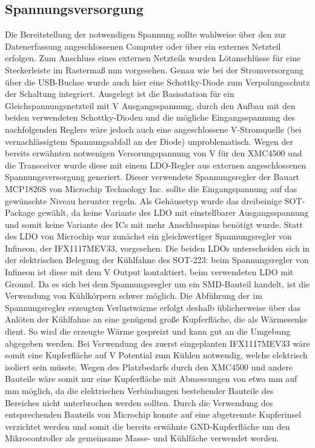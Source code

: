 \subsection{Spannungsversorgung}
Die Bereitstellung der notwendigen Spannung sollte wahlweise über den zur Datenerfassung angeschlossenen Computer oder über ein externes Netzteil erfolgen. Zum Anschluss eines externen Netzteils wurden Lötanschlüsse für eine Steckerleiste im Rastermaß \unit[2,54]{mm} vorgesehen. Genau wie bei der Stromversorgung über die USB-Buchse wurde auch hier eine Schottky-Diode zum Verpolungsschutz der Schaltung integriert. Ausgelegt ist die Basisstation für ein Gleichspannungsnetzteil mit \unit[5]{V} Ausgangsspannung, durch den Aufbau mit den beiden verwendeten Schottky-Dioden und die mögliche Eingangsspannung des nachfolgenden Reglers wäre jedoch auch eine angeschlossene \unit[6]{V}-Stromquelle (bei vernachlässigtem Spannungsabfall an der Diode) unproblematisch.
Wegen der bereits erwähnten notwenigen Versorungspannung von \unit[3,3]{V} für den XMC4500 und die Transceiver wurde diese mit einem \ac{LDO}-Regler aus externen angeschlossenen Spannungsversorgung generiert. Dieser verwendete Spannungsregler der Bauart MCP1826S von Microchip Technology Inc. sollte die Eingangspannung auf das gewünschte Niveau herunter regeln.
Als Gehäusetyp wurde das dreibeinige \ac{SOT}-Package gewählt, da keine Variante des \ac{LDO} mit einstellbarer Ausgangsspannung und somit keine Variante des \acp{IC} mit mehr Anschlusspins benötigt wurde. Statt des \ac{LDO} von Microchip war zunächst ein gleichwertiger Spannungsregler von Infineon, der IFX1117MEV33, vorgesehen. Die beiden \acp{LDO} unterscheiden sich in der elektrischen Belegung der Kühlfahne des \ac{SOT}-223: beim Spannungsregler von Infineon ist diese mit dem \unit[3,3]{V} Output kontaktiert, beim verwendeten \ac{LDO} mit Ground. Da es sich bei dem Spannungsregler um ein \ac{SMD}-Bauteil handelt, ist die Verwendung von Kühlkörpern schwer möglich. Die Abführung der im Spannungsregler erzeugten Verlustwärme erfolgt deshalb üblicherweise über das Anlöten der Kühlfahne an eine genügend große Kupferfläche, die als Wärmesenke dient. So wird die erzeugte Wärme gespreizt und kann gut an die Umgebung abgegeben werden. Bei Verwendung des zuerst eingeplanten IFX1117MEV33 wäre somit eine Kupferfläche auf \unit[3,3]{V} Potential zum Kühlen notwendig, welche elektrisch isoliert sein müsste. Wegen des Platzbedarfs durch den XMC4500 und andere Bauteile wäre somit nur eine Kupferfläche mit Abmessungen von etwa \unit[15]{mm} auf \unit[16]{mm} möglich, da die elektrischen Verbindungen bestehender Bauteile des Bereiches nicht unterbrochen werden sollten. Durch die Verwendung des entsprechenden Bauteils von Microchip konnte auf eine abgetrennte Kupferinsel verzichtet werden und somit die bereits erwähnte \acs{GND}-Kupferfläche um den Mikrocontroller als gemeinsame Masse- und Kühlfäche verwendet werden.
